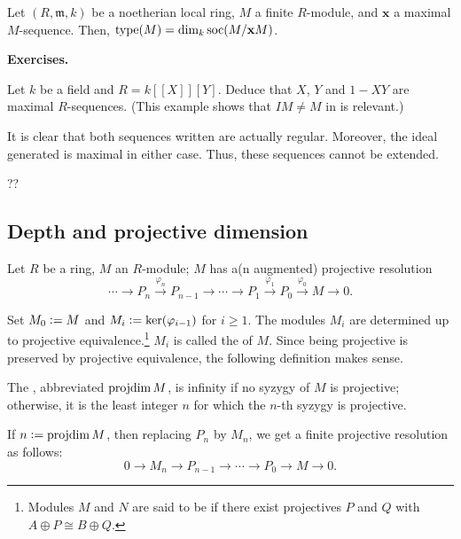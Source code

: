 \documentclass[12pt]{article}
\begin{document}
\begin{por}
	Let $(R, \mathfrak{m}, k)$ be a noetherian local ring, $M$ a finite $R$-module, and $\mathbf{x}$ a maximal $M$-sequence. Then, $\operatorname{type}(M) = \dim_{k} \operatorname{soc}(M/\mathbf{x} M)$.
\end{por}

\textbf{Exercises.}

\begin{exe}
	Let $k$ be a field and $R = k[\![X]\!][Y]$. Deduce that $X$, $Y$ and $1 - XY$ are maximal $R$-sequences. (This example shows that $IM \neq M$ in  is relevant.)
\end{exe}
\begin{soln}
	It is clear that both sequences written are actually regular. Moreover, the ideal generated is maximal in either case. Thus, these sequences cannot be extended.
\end{soln}

??

\subsection{Depth and projective dimension}

Let $R$ be a ring, $M$ an $R$-module; $M$ has a(n augmented) projective resolution
\begin{equation*} 
	\cdots \to P_{n} \xrightarrow{\varphi_{n}} P_{n - 1} \to \cdots \to P_{1} \xrightarrow{\varphi_{1}} P_{0} \xrightarrow{\varphi_{0}} M \to 0.
\end{equation*}

Set $M_{0} \vcentcolon= M$ and $M_{i} \vcentcolon= \ker(\varphi_{i - 1})$ for $i \ge 1$. The modules $M_{i}$ are determined up to projective equivalence.\footnote{Modules $M$ and $N$ are said to be  if there exist projectives $P$ and $Q$ with $A \oplus P \cong B \oplus Q$.} $M_{i}$ is called the  of $M$. Since being projective is preserved by projective equivalence, the following definition makes sense.

\begin{defn}
	The , abbreviated $\operatorname{projdim} M$, is infinity if no syzygy of $M$ is projective; otherwise, it is the least integer $n$ for which the $n$-th syzygy is projective.
\end{defn}

If $n \vcentcolon= \operatorname{projdim} M$, then replacing $P_{n}$ by $M_{n}$, we get a finite projective resolution as follows:
\begin{equation*} 
	0 \to M_{n} \to P_{n - 1} \to \cdots \to P_{0} \to M \to 0.
\end{equation*}
\end{document}
